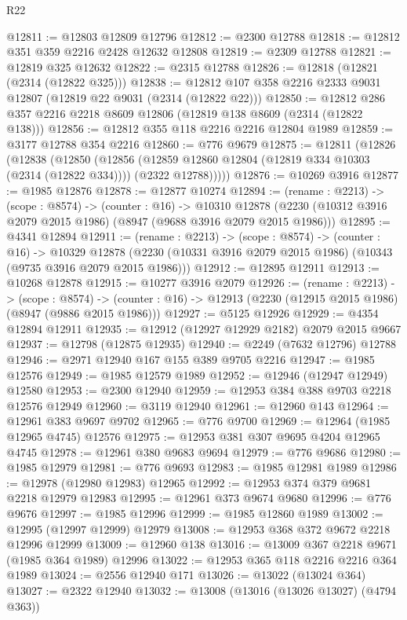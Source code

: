 \begin{lexlean}{R22}
\begin{coremodule}
@12811 := @12803 @12809 @12796
@12812 := @2300 @12788
@12818 := @12812 @351 @359 @2216 @2428 @12632 @12808
@12819 := @2309 @12788
@12821 := @12819 @325 @12632
@12822 := @2315 @12788
@12826 := @12818 (@12821 (@2314 (@12822 @325)))
@12838 := @12812 @107 @358 @2216 @2333 @9031 @12807 (@12819 @22 @9031 (@2314 (@12822 @22)))
@12850 := @12812 @286 @357 @2216 @2218 @8609 @12806 (@12819 @138 @8609 (@2314 (@12822 @138)))
@12856 := @12812 @355 @118 @2216 @2216 @12804 @1989
@12859 := @3177 @12788 @354 @2216
@12860 := @776 @9679
@12875 := @12811
    (@12826
      (@12838
        (@12850
          (@12856
            (@12859 @12860 @12804 (@12819 @334 @10303 (@2314 (@12822 @334))))
            (@2322 @12788)))))
@12876 := @10269 @3916
@12877 := @1985 @12876
@12878 := @12877 @10274
@12894 := (rename : @2213) ->
  (scope : @8574) ->
  (counter : @16) ->
  @10310 @12878 (@2230 (@10312 @3916 @2079 @2015 @1986) (@8947 (@9688 @3916 @2079 @2015 @1986)))
@12895 := @4341 @12894
@12911 := (rename : @2213) ->
  (scope : @8574) ->
  (counter : @16) ->
  @10329 @12878 (@2230 (@10331 @3916 @2079 @2015 @1986) (@10343 (@9735 @3916 @2079 @2015 @1986)))
@12912 := @12895 @12911
@12913 := @10268 @12878
@12915 := @10277 @3916 @2079
@12926 := (rename : @2213) ->
  (scope : @8574) ->
  (counter : @16) -> @12913 (@2230 (@12915 @2015 @1986) (@8947 (@9886 @2015 @1986)))
@12927 := @5125 @12926
@12929 := @4354 @12894 @12911
@12935 := @12912 (@12927 @12929 @2182) @2079 @2015 @9667
@12937 := @12798 (@12875 @12935)
@12940 := @2249 (@7632 @12796) @12788
@12946 := @2971 @12940 @167 @155 @389 @9705 @2216
@12947 := @1985 @12576
@12949 := @1985 @12579 @1989
@12952 := @12946 (@12947 @12949) @12580
@12953 := @2300 @12940
@12959 := @12953 @384 @388 @9703 @2218 @12576 @12949
@12960 := @3119 @12940
@12961 := @12960 @143
@12964 := @12961 @383 @9697 @9702
@12965 := @776 @9700
@12969 := @12964 (@1985 @12965 @4745) @12576
@12975 := @12953 @381 @307 @9695 @4204 @12965 @4745
@12978 := @12961 @380 @9683 @9694
@12979 := @776 @9686
@12980 := @1985 @12979
@12981 := @776 @9693
@12983 := @1985 @12981 @1989
@12986 := @12978 (@12980 @12983) @12965
@12992 := @12953 @374 @379 @9681 @2218 @12979 @12983
@12995 := @12961 @373 @9674 @9680
@12996 := @776 @9676
@12997 := @1985 @12996
@12999 := @1985 @12860 @1989
@13002 := @12995 (@12997 @12999) @12979
@13008 := @12953 @368 @372 @9672 @2218 @12996 @12999
@13009 := @12960 @138
@13016 := @13009 @367 @2218 @9671 (@1985 @364 @1989) @12996
@13022 := @12953 @365 @118 @2216 @2216 @364 @1989
@13024 := @2556 @12940 @171
@13026 := @13022 (@13024 @364)
@13027 := @2322 @12940
@13032 := @13008 (@13016 (@13026 @13027) (@4794 @363))

\end{coremodule}
\end{lexlean}
